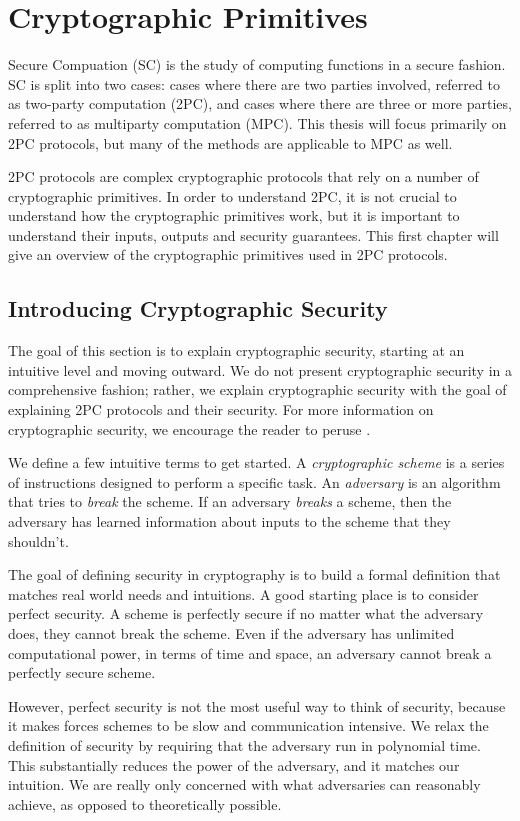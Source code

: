 \chapter{Cryptographic Primitives}
Secure Compuation (SC) is the study of computing functions in a secure fashion. 
SC is split into two cases: cases where there are two parties involved, referred to as two-party computation (2PC), and cases where there are three or more parties, referred to as multiparty computation (MPC).
This thesis will focus primarily on 2PC protocols, but many of the methods are applicable to MPC as well.

2PC protocols are complex cryptographic protocols that rely on a number of cryptographic primitives.
In order to understand 2PC, it is not crucial to understand how the cryptographic primitives work, but it is important to understand their inputs, outputs and security guarantees. 
This first chapter will give an overview of the cryptographic primitives used in 2PC protocols.

\section{Introducing Cryptographic Security} 
The goal of this section is to explain cryptographic security, starting at an intuitive level and moving outward. 
We do not present cryptographic security in a comprehensive fashion; rather, we explain cryptographic security with the goal of explaining 2PC protocols and their security.
For more information on cryptographic security, we encourage the reader to peruse \cite{katzlindelltextbook}. 

We define a few intuitive terms to get started.
A \textit{cryptographic scheme} is a series of instructions designed to perform a specific task. 
An \textit{adversary} is an algorithm that tries to \textit{break} the scheme. 
If an adversary \textit{breaks} a scheme, then the adversary has learned information about inputs to the scheme that they shouldn't. 

The goal of defining security in cryptography is to build a formal definition that matches real world needs and intuitions. 
A good starting place is to consider perfect security. 
A scheme is perfectly secure if no matter what the adversary does, they cannot break the scheme.
Even if the adversary has unlimited computational power, in terms of time and space, an adversary cannot break a perfectly secure scheme. 

However, perfect security is not the most useful way to think of security, because it makes forces schemes to be slow and communication intensive.
We relax the definition of security by requiring that the adversary run in polynomial time. 
This substantially reduces the power of the adversary, and it matches our intuition. 
We are really only concerned with what adversaries can reasonably achieve, as opposed to theoretically possible. 

